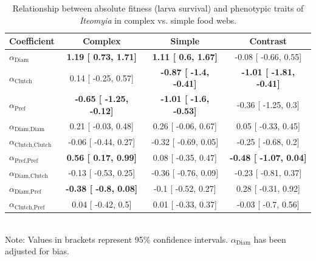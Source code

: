 \begin{table}[h]
\caption{Relationship between absolute fitness (larva survival) and phenotypic traits of \textit{Iteomyia} in complex vs. simple food webs.}
\label{Table:Coefs}
\centering
\begin{tabular}{lccc}
\\ 
\hline
\textbf{Coefficient} & \textbf{Complex} & \textbf{Simple} & \textbf{Contrast}  \\ 
\hline
$\alpha_{\text{Diam}}$ & 
\textbf{
1.19 [
0.73,
1.71] }& 
\textbf{
1.11 [
0.6,
1.67] }& 

-0.08 [
-0.66,
0.55] \\

$\alpha_{\text{Clutch}}$ & 
0.14 [
-0.25,
0.57] & 
\textbf{
-0.87 [
-1.4,
-0.41] }& 
\textbf{
-1.01 [
-1.81,
-0.41] }\\

$\alpha_{\text{Pref}}$ &
\textbf{
-0.65 [
-1.25,
-0.12] }& 
\textbf{
-1.01 [
-1.6,
-0.53] }& 

-0.36 [
-1.25,
0.3] \\

$\alpha_{\text{Diam,Diam}}$ &
0.21 [
-0.03,
0.48] & 

0.26 [
-0.06,
0.67] & 

0.05 [
-0.33,
0.45] \\

$\alpha_{\text{Clutch,Clutch}}$ & 
-0.06 [
-0.44,
0.27] & 

-0.32 [
-0.69,
0.05] & 

-0.25 [
-0.68,
0.2] \\

$\alpha_{\text{Pref,Pref}}$ & 
\textbf{
0.56 [
0.17,
0.99] }& 

0.08 [
-0.35,
0.47] & 
\textbf{
-0.48 [
-1.07,
0.04] }\\

$\alpha_{\text{Diam,Clutch}}$ & 
-0.13 [
-0.53,
0.25] & 

-0.36 [
-0.76,
0.09] & 

-0.23 [
-0.81,
0.37] \\

$\alpha_{\text{Diam,Pref}}$ & 
\textbf{
-0.38 [
-0.8,
0.08] }& 

-0.1 [
-0.52,
0.27] & 

0.28 [
-0.31,
0.92] \\

$\alpha_{\text{Clutch,Pref}}$ & 
0.04 [
-0.42,
0.5] & 

0.01 [
-0.33,
0.37] & 

-0.03 [
-0.7,
0.56] \\ 
\hline
\end{tabular}
\bigskip{}
\\
{\footnotesize Note: Values in brackets represent 95\% confidence intervals. $\alpha_{\text{Diam}}$ has been adjusted for bias.}
\end{table}

